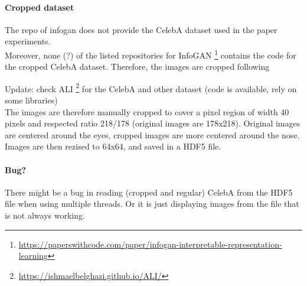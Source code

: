 \documentclass[11pt,a4paper]{article}
\begin{document}
\paragraph{Cropped dataset}

The repo of infogan does not provide the CelebA dataset used in the paper
experiments. \\

Moreover, none (?) of the listed repositories for InfoGAN
\footnote{\url{https://paperswithcode.com/paper/infogan-interpretable-representation-learning}}
contains the code for the cropped CelebA dataset. Therefore, the images are
cropped following

Update: check ALI \footnote{\url{https://ishmaelbelghazi.github.io/ALI/}} for the CelebA and other dataset (code is available, rely on some libraries) \\

The images are therefore manually cropped to cover a  pixel region
of width 40 pixels and respected ratio 218/178 (original images are 178x218).
Original images are centered around the eyes, cropped images are more centered
around the nose. \\

Images are then rezised to 64x64, and saved in a HDF5 file.
% 

\paragraph{Bug?} There might be a bug in reading (cropped and regular) CelebA from the HDF5 file when using multiple threads. Or it is just displaying images from the file that is not always working.



\printbibliography{}
\end{document}
